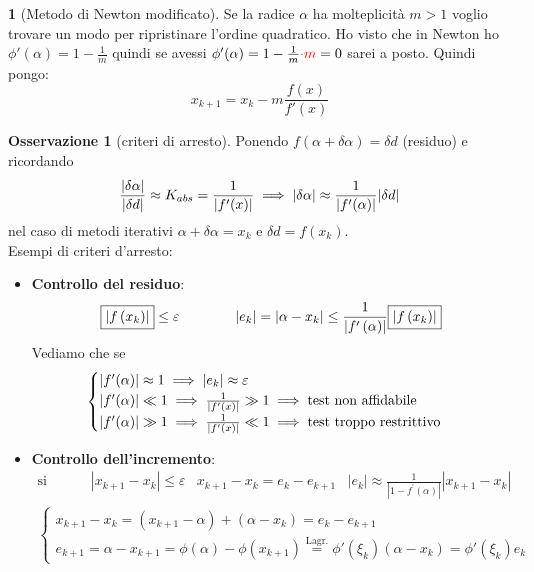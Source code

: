 \documentclass[a4paper,10pt]{article}
\theoremstyle{definition}
\theoremstyle{indentdefinition}
\theoremstyle{indenttheorem}
\theoremstyle{myremark}
\newtheorem*{rem*}{Osservazione}
\theoremstyle{indentgeneral}
\newtheorem{lyxalgorithm}[thm]{\protect\algorithmname}
\theoremstyle{plain}
\theoremstyle{plain}
\begin{document}
\begin{lyxalgorithm}[Metodo di Newton modificato]
    Se la radice $\alpha$ ha molteplicità $m>1$ voglio trovare un modo per ripristinare l'ordine quadratico. Ho visto che in Newton ho  $\phi'(\alpha)=1-\frac{1}{m}$ quindi se avessi  $\phi'(\alpha)=1-\frac{1}{m}\textcolor{red}{\cdot m}=0$ sarei a posto. Quindi pongo:
    $$x_{k+1}=x_k-m\frac{f(x)}{f'(x)}$$
\end{lyxalgorithm}

\begin{rem*}[criteri di arresto] Ponendo $f(\alpha+\delta\alpha)=\delta d$ (residuo) e ricordando
$$\frac{\abs{\delta\alpha}}{\abs{\delta d}}\approx K_{abs}=\frac{1}{\abs{f'(x)}}\implies\abs{\delta\alpha}\approx\frac{1}{\abs{f'(\alpha)}}\abs{\delta d}$$
nel caso di metodi iterativi $\alpha+\delta\alpha=x_k$ e $\delta d=f(x_k)$. \\
Esempi di criteri d'arresto:
\begin{itemize}
    \item \textbf{Controllo del residuo}:
\[
\boxed{\left|f\left(x_{k}\right)\right|}\leq\varepsilon \qquad\qquad\abs{e_k}=\left|\alpha-x_{k}\right|\leq\frac{1}{\left|f^{\prime}\left(\alpha\right)\right|}\boxed{\left|f\left(x_{k}\right)\right|}\\
\]
Vediamo che se $$\begin{cases}
    \abs{f'(\alpha)}\approx 1 \implies \abs{e_k}\approx\varepsilon \\
    \abs{f'(\alpha)}\ll 1 \implies \frac{1}{\abs{f'(x)}}\gg 1 \implies \text{test non affidabile}\\
    \abs{f'(\alpha)}\gg 1 \implies \frac{1}{\abs{f'(x)}}\ll 1 \implies \text{test troppo  restrittivo}\\
\end{cases}$$
\item \textbf{Controllo dell'incremento}:
\[
\begin{array}{rlll}
\text{si arresta se} & \boxed{\left|x_{k+1}-x_{k}\right|}\leq\varepsilon & x_{k+1}-x_{k}=e_{k}-e_{k+1} & \left|e_{k}\right|\approx\frac{1}{\left|1-f^{\prime}\left(\alpha\right)\right|}\boxed{\left|x_{k+1}-x_{k}\right|}
\end{array}
\]
\begin{align*}
    \begin{cases}
        x_{k+1}-x_k=(x_{k+1}-\alpha)+(\alpha-x_k)=e_k-e_{k+1}\\
        e_{k+1}=\alpha-x_{k+1}=\phi(\alpha)-\phi(x_{k+1})\overset{\text{Lagr.}}{=}\phi'(\xi_k)(\alpha-x_k)=\phi'(\xi_k)e_k

\end{cases}
\end{align*}
\end{itemize}
\end{rem*}
\end{document}
